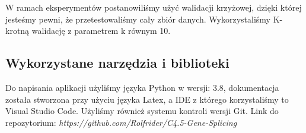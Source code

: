 W ramach eksperymentów postanowiliśmy użyć walidacji krzyżowej, dzięki której jesteśmy pewni, że przetestowaliśmy cały zbiór danych. Wykorzystaliśmy K-krotną walidację z parametrem k równym 10.
\subsection{Wykorzystane narzędzia i biblioteki}


Do napisania aplikacji użyliśmy języka Python w wersji: 3.8, dokumentacja została stworzona przy użyciu języka Latex, a IDE z którego korzystaliśmy to Visual Studio Code. Użyliśmy również systemu kontroli wersji Git.
Link do repozytorium: {\it https://github.com/Rolfrider/C4.5-Gene-Splicing}
